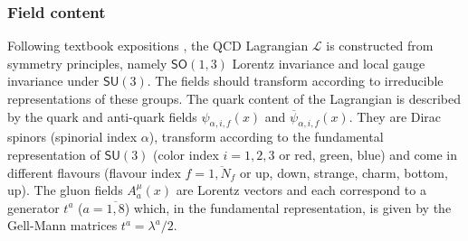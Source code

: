 \subsubsection*{Field content}
Following textbook expositions \cite{maggiore, peskin, greiner}, the {\sffamily QCD} Lagrangian $\mathcal{L}$ is constructed from symmetry principles, namely $\textsf{SO}(1,3)$ Lorentz invariance and local gauge invariance under $\textsf{SU}(3)$. The fields should transform according to irreducible representations of these groups. The quark content of the Lagrangian is described by the quark and anti-quark fields $\psi_{\alpha,i,f}(x)$ and $\overline{\psi}_{\alpha,i,f}(x)$. They are Dirac spinors (spinorial index $\alpha$), transform according to the fundamental representation of $\textsf{SU}(3)$ (color index $i=1,2,3$ or red, green, blue) and come in different flavours (flavour index $f=\overline{1,N_f}$ or up, down, strange, charm, bottom, up). The gluon fields $A_a^\mu(x)$ are Lorentz vectors and each correspond to a generator $t^a$ ($a=\overline{1,8}$) which, in the fundamental representation, is given by the Gell-Mann matrices $t^a=\lambda^a/2$.

